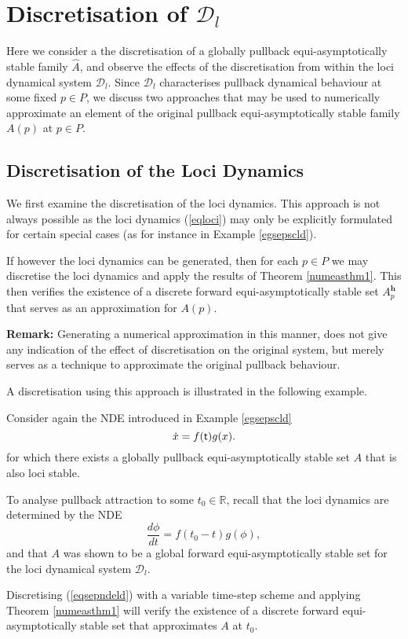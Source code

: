 \section{Discretisation of $\mathcal{D}_l$}

Here we consider a the discretisation of a globally pullback
equi-asymptotically stable family $\hat{A}$, and observe the effects of the
discretisation from within the loci dynamical system $\mathcal{D}_l$. Since
$\mathcal{D}_l$ characterises pullback dynamical behaviour at some fixed $p \in
P$,  we discuss two approaches that may be used to numerically approximate an
element of the original pullback equi-asymptotically stable family $A(p)$ at $p
\in P$.

\subsection{Discretisation of the Loci Dynamics}
We first examine the discretisation of the loci dynamics. This approach is not
always possible as the loci dynamics (\ref{eqloci}) may only be explicitly
formulated for certain special cases (as for instance in Example
\ref{egsepscld}).

If however the loci dynamics can be generated, then for each $p \in P$ we may
discretise the loci dynamics and apply the results of Theorem \ref{numeasthm1}.
This then verifies the existence of a discrete forward equi-asymptotically
stable set $A_p^{\textbf{h}}$ that serves as an approximation for $A(p)$.

{\bf Remark:} Generating a numerical approximation in this manner,
does not give any indication of the effect of discretisation on
the original system, but merely serves as a technique to approximate the
original pullback behaviour.

A discretisation using this approach is illustrated in the following
example.

\begin{eg}\label{egsepsc}
Consider again the NDE introduced in Example \ref{egsepscld}
\[ \dot{x} = f( \mathsf{\mathsf{t}})g(x). \]
for which there exists a globally pullback equi-asymptotically stable
set $A$ that is also loci stable.

To analyse pullback attraction to some $t_0 \in \mathbb{R}$, recall that
the loci dynamics are determined by the NDE
\begin{equation} \label{eqsepndeld}
  \frac{d \phi}{dt} = f(t_0 - t) g(\phi),
\end{equation}
and that $A$ was shown to be a global forward equi-asymptotically stable set for
the loci dynamical system $\mathcal{D}_l$.

Discretising (\ref{eqsepndeld}) with a variable time-step scheme and applying
Theorem \ref{numeasthm1} will verify the existence of a discrete forward
equi-asymptotically stable set that approximates $A$ at $t_0$.
\end{eg}

